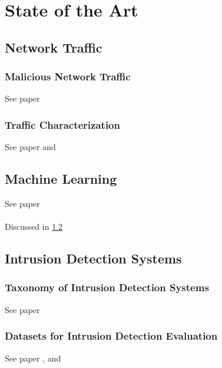 \chapter{State of the Art}

\lipsum[3]

\section{Network Traffic}
\label{sec:network-traffic}

\lipsum

\subsection{Malicious Network Traffic}
\label{subsec:malicious-traffic}

See paper \cite{icissp18} \\

\lipsum

\subsection{Traffic Characterization}
\label{subsec:traffic-characterization}

See paper \cite{Iglesias2015} and  \cite{Velan2016} \\

\lipsum

\section{Machine Learning}
\label{sec:machine-learning}

See paper \cite{Khraisat2019} \\

\lipsum \\
Discussed in \ref{sec:machine-learning}

\section{Intrusion Detection Systems}
\label{sec:intrusion-detection-system}

\lipsum

\subsection{Taxonomy of Intrusion Detection Systems}

See paper \cite{Liu2019}

\subsection{Datasets for Intrusion Detection Evaluation}
\label{subsec:datasets-for-evaluation}

See paper \cite{icissp18}, \cite{Khraisat2019} and \cite{Leevy2020} \\
\lipsum